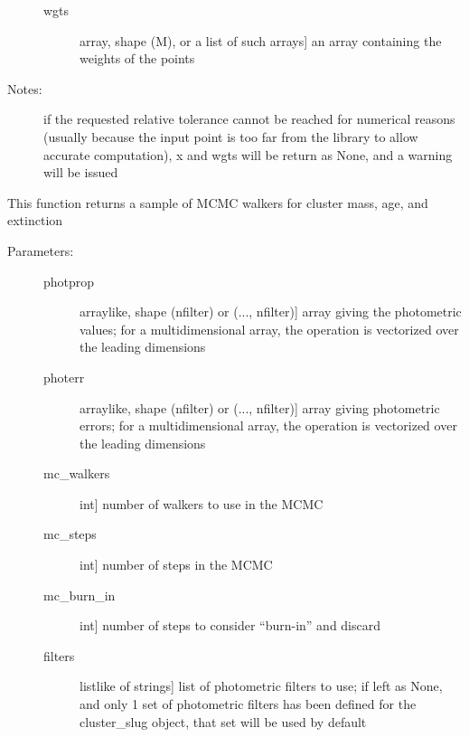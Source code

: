 \documentclass[letterpaper,10pt,english]{sphinxmanual}
\begin{document}
\begin{fulllineitems}
\begin{fulllineitems}
\begin{description}
\begin{description}
\item[{wgts}] \leavevmode{[}array, shape (M), or a list of such arrays{]}
an array containing the weights of the points

\end{description}

\item[{Notes:}] \leavevmode
if the requested relative tolerance cannot be reached for
numerical reasons (usually because the input point is too
far from the library to allow accurate computation), x and
wgts will be return as None, and a warning will be issued

\end{description}

\end{fulllineitems}


\begin{fulllineitems}
\label{cluster_slug:slugpy.cluster_slug.cluster_slug.mcmc}
This function returns a sample of MCMC walkers for cluster
mass, age, and extinction
\begin{description}
\item[{Parameters:}] \leavevmode\begin{description}
\item[{photprop}] \leavevmode{[}arraylike, shape (nfilter) or (..., nfilter){]}
array giving the photometric values; for a
multidimensional array, the operation is vectorized over
the leading dimensions

\item[{photerr}] \leavevmode{[}arraylike, shape (nfilter) or (..., nfilter){]}
array giving photometric errors; for a multidimensional
array, the operation is vectorized over the leading
dimensions

\item[{mc\_walkers}] \leavevmode{[}int{]}
number of walkers to use in the MCMC

\item[{mc\_steps}] \leavevmode{[}int{]}
number of steps in the MCMC

\item[{mc\_burn\_in}] \leavevmode{[}int{]}
number of steps to consider ``burn-in'' and discard

\item[{filters}] \leavevmode{[}listlike of strings{]}
list of photometric filters to use; if left as None, and
only 1 set of photometric filters has been defined for
the cluster\_slug object, that set will be used by
default


\end{description}
\end{description}
\end{fulllineitems}
\end{fulllineitems}
\end{document}
